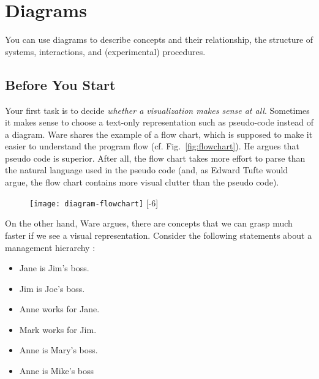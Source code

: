 \section{Diagrams}

You can use diagrams to describe concepts and their relationship, the structure of systems, interactions, and (experimental) procedures.


\subsection{Before You Start}

Your first task is to decide \emph{whether a visualization makes sense at all}. Sometimes it makes sense to choose a text-only representation such as pseudo-code instead of a diagram. Ware \cite{Ware12} shares the example of a flow chart, which is supposed to make it easier to understand the program flow (cf. Fig.~\ref{fig:flowchart}). He argues that pseudo code is superior. After all, the flow chart takes more effort to parse than the natural language used in the pseudo code (and, as Edward Tufte would argue, the flow chart contains more visual clutter than the pseudo code).

\begin{figure}[t]
\centering
\texttt{[image: diagram-flowchart]}
[-6\baselineskip]
\end{figure}

On the other hand, Ware argues, there are concepts that we can grasp much faster if we see a visual representation. Consider the following statements about a management hierarchy \cite{Ware12}:

\begin{itemize}
  \item Jane is Jim’s boss.
  \item Jim is Joe’s boss.
  \item Anne works for Jane.
  \item Mark works for Jim.
  \item Anne is Mary’s boss.
  \item Anne is Mike’s boss
\end{itemize}


